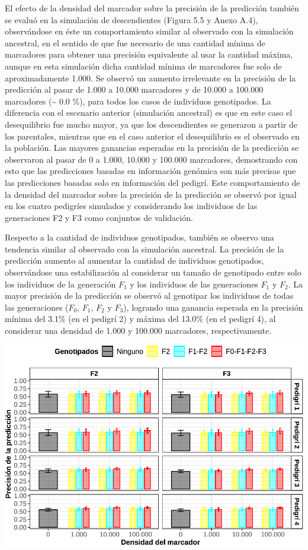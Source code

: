 \documentclass[11pt,spanish,a4paper,oneside,]{book} %
\begin{document}
El efecto de la densidad del marcador sobre la precisión de la predicción también se evaluó en la simulación de descendientes (Figura 5.5 y Anexo A.4), observándose en éste un comportamiento similar al observado con la simulación ancestral, en el sentido de que fue necesario de una cantidad mínima de marcadores para obtener una precisión equivalente al usar la cantidad máxima, aunque en esta simulación dicha cantidad mínima de marcadores fue solo de aproximadamente 1.000. Se observó un aumento irrelevante en la precisión de la predicción al pasar de 1.000 a 10.000 marcadores y de 10.000 a 100.000 marcadores (\textasciitilde{} 0.0 \%), para todos los casos de individuos genotipados. La diferencia con el escenario anterior (simulación ancestral) es que en este caso el desequilibrio fue mucho mayor, ya que los descendientes se generaron a partir de los parentales, mientras que en el caso anterior el desequilibrio es el observado en la población. Las mayores ganancias esperadas en la precisión de la predicción se observaron al pasar de 0 a 1.000, 10.000 y 100.000 marcadores, demostrando con esto que las predicciones basadas en información genómica son más precisas que las predicciones basadas solo en información del pedigrí. Este comportamiento de la densidad del marcador sobre la precisión de la predicción se observó por igual en los cuatro pedigríes simulados y considerando los individuos de las generaciones F2 y F3 como conjuntos de validación.

Respecto a la cantidad de individuos genotipados, también se observo una tendencia similar al observado con la simulación ancestral. La precisión de la predicción aumento al aumentar la cantidad de individuos genotipados, observándose una estabilización al considerar un tamaño de genotipado entre solo los individuos de la generación \(F_{1}\) y los individuos de las generaciones \(F_{1}\) y \(F_{2}\). La mayor precisión de la predicción se observó al genotipar los individuos de todas las generaciones (\(F_{0}\), \(F_{1}\), \(F_{2}\) y \(F_{3}\)), logrando una ganancia esperada en la precisión mínima del 3.1\% (en el pedigrí 2) y máxima del 13.0\% (en el pedigrí 4), al considerar una densidad de 1.000 y 100.000 marcadores, respectivamente.

\begin{center}\includegraphics[width=1\linewidth]{figures/Cor_F2_F3} \end{center}
\end{document}
